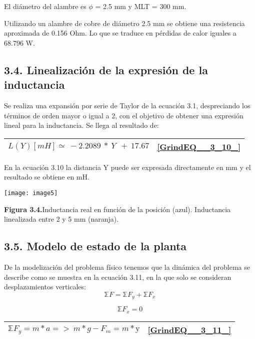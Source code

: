 \documentclass{article} %
\begin{document}
\noindent 

\noindent El di\'{a}metro del alambre es $\phi $ = 2.5 mm y MLT = 300 mm.

\noindent Utilizando un alambre de cobre de di\'{a}metro 2.5 mm se obtiene una resistencia aproximada de 0.156 Ohm. Lo que se traduce en p\'{e}rdidas de calor iguales a  68.796 W.  

\noindent 
\subsection{3.4. Linealizaci\'{o}n de la expresi\'{o}n de la inductancia}

\noindent 

\noindent Se realiza una expansi\'{o}n por serie de Taylor de la ecuaci\'{o}n 3.1, despreciando los t\'{e}rminos de orden mayor o igual a 2, con el objetivo de obtener una expresi\'{o}n lineal para la inductancia. Se llega al resultado de:

\noindent 

\begin{tabular}{|p{3.9in}|p{0.4in}|} \hline 
$L(Y)[mH]\simeq \ -2.2089\ *\ Y\ \ +\ 17.67$ & \eqref{GrindEQ__3_10_}  \\ \hline 
\end{tabular}



\noindent En la ecuaci\'{o}n 3.10 la distancia Y puede ser expresada directamente en mm y el resultado se obtiene en mH.

\noindent \texttt{[image: image5]}

\noindent \textbf{Figura 3.4.}Inductancia real en funci\'{o}n de la posici\'{o}n (azul). Inductancia linealizada entre 2 y 5 mm (naranja).\textbf{ }

\noindent 
\subsection{3.5. Modelo de estado de la planta}

\noindent De la modelizaci\'{o}n del problema f\'{i}sico tenemos que la din\'{a}mica del problema se describe como se muestra en la ecuaci\'{o}n 3.11, en la que solo se consideran desplazamientos verticales:
\[\textrm{⅀}{F=\textrm{⅀}F}_y+{\textrm{⅀}F}_x\] 

\[{\textrm{⅀}F}_x=0\] 


\begin{tabular}{|p{3.9in}|p{0.4in}|} \hline 
$\textrm{⅀}F_y=m*a=>\ m*g-F_m=m*\textrm{\"{y}}$ & \eqref{GrindEQ__3_11_}  \\ \hline 
\end{tabular}
\end{document}

